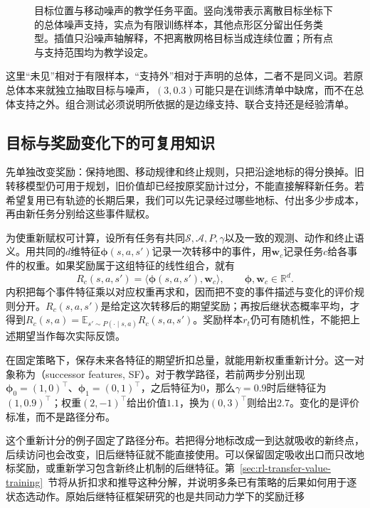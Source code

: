 \begin{figure}[htbp]
  \centering
  
  \caption{目标位置与移动噪声的教学任务平面。竖向浅带表示离散目标坐标下的总体噪声支持，实点为有限训练样本，其他点形区分留出任务类型。插值只沿噪声轴解释，不把离散网格目标当成连续位置；所有点与支持范围均为教学设定。}
  \label{fig:rl-transfer-task-plane}
\end{figure}

这里“未见”相对于有限样本，“支持外”相对于声明的总体，二者不是同义词。若原总体本来就独立抽取目标与噪声，$(3,0.3)$可能只是在训练清单中缺席，而不在总体支持之外。组合测试必须说明所依据的是边缘支持、联合支持还是经验清单。

\subsection{目标与奖励变化下的可复用知识}
\label{sec:rl-transfer-reward-change}

先单独改变奖励：保持地图、移动规律和终止规则，只把沿途地标的得分换掉。旧转移模型仍可用于规划，旧价值却已经按原奖励计过分，不能直接解释新任务。若希望复用已有轨迹的长期后果，我们可以先记录经过哪些地标、付出多少步成本，再由新任务分别给这些事件赋权。

为使重新赋权可计算，设所有任务有共同$\mathcal S,\mathcal A,P,\gamma$以及一致的观测、动作和终止语义。用共同的$d$维特征$\bm\phi(s,a,s')$记录一次转移中的事件，用$\bm w_c$记录任务$c$给各事件的权重。如果奖励属于这组特征的线性组合，就有
\begin{equation}
  R_c(s,a,s')=\langle\bm\phi(s,a,s'),\bm w_c\rangle,
  \qquad \bm\phi,\bm w_c\in\mathbb R^d.
  \label{eq:rl-transfer-linear-reward}
\end{equation}
内积把每个事件特征乘以对应权重再求和，因而把不变的事件描述与变化的评价规则分开。$R_c(s,a,s')$是给定这次转移后的期望奖励；再按后继状态概率平均，才得到$R_c(s,a)=\mathbb E_{s'\sim P(\cdot\mid s,a)}R_c(s,a,s')$。奖励样本$r_t$仍可有随机性，不能把上述期望当作每次实际反馈。

在固定策略下，保存未来各特征的期望折扣总量，就能用新权重重新计分。这一对象称为（successor features, SF）。对于教学路径，若前两步分别出现$\bm\phi_0=(1,0)^\top$、$\bm\phi_1=(0,1)^\top$，之后特征为0，那么$\gamma=0.9$时后继特征为$(1,0.9)^\top$；权重$(2,-1)^\top$给出价值$1.1$，换为$(0,3)^\top$则给出$2.7$。变化的是评价标准，而不是路径分布。

这个重新计分的例子固定了路径分布。若把得分地标改成一到达就吸收的新终点，后续访问也会改变，旧后继特征就不能直接使用。可以保留固定吸收出口而只改地标奖励，或重新学习包含新终止机制的后继特征。第~\ref{sec:rl-transfer-value-training}~节将从折扣求和推导这种分解，并说明多条已有策略的后果如何用于逐状态选动作。原始后继特征框架研究的也是共同动力学下的奖励迁移

